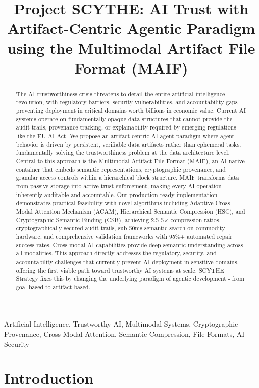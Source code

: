 \documentclass[conference]{IEEEtran}
\title{Project SCYTHE: AI Trust with Artifact-Centric Agentic Paradigm using the Multimodal Artifact File Format (MAIF)}
\author{
\IEEEauthorblockN{Cool Peeps Gang}
\IEEEauthorblockA{
Affiliation\\
Email: coolpeeps@owasp.org \& coolpeeps@industry.org}
}
\begin{document}
\maketitle

\begin{abstract}
The AI trustworthiness crisis threatens to derail the entire artificial intelligence revolution, with regulatory barriers, security vulnerabilities, and accountability gaps preventing deployment in critical domains worth billions in economic value. Current AI systems operate on fundamentally opaque data structures that cannot provide the audit trails, provenance tracking, or explainability required by emerging regulations like the EU AI Act. We propose an artifact-centric AI agent paradigm where agent behavior is driven by persistent, verifiable data artifacts rather than ephemeral tasks, fundamentally solving the trustworthiness problem at the data architecture level. Central to this approach is the Multimodal Artifact File Format (MAIF), an AI-native container that embeds semantic representations, cryptographic provenance, and granular access controls within a hierarchical block structure. MAIF transforms data from passive storage into active trust enforcement, making every AI operation inherently auditable and accountable. Our production-ready implementation demonstrates practical feasibility with novel algorithms including Adaptive Cross-Modal Attention Mechanism (ACAM), Hierarchical Semantic Compression (HSC), and Cryptographic Semantic Binding (CSB), achieving 2.5-5× compression ratios, cryptographically-secured audit trails, sub-50ms semantic search on commodity hardware, and comprehensive validation frameworks with 95\%+ automated repair success rates. Cross-modal AI capabilities provide deep semantic understanding across all modalities. This approach directly addresses the regulatory, security, and accountability challenges that currently prevent AI deployment in sensitive domains, offering the first viable path toward trustworthy AI systems at scale. SCYTHE Strategy fixes this by changing the underlying paradigm of agentic development - from goal based to artifact based. 
\end{abstract}

\begin{IEEEkeywords}
Artificial Intelligence, Trustworthy AI, Multimodal Systems, Cryptographic Provenance, Cross-Modal Attention, Semantic Compression, File Formats, AI Security
\end{IEEEkeywords}

\section{Introduction}
\end{document}
